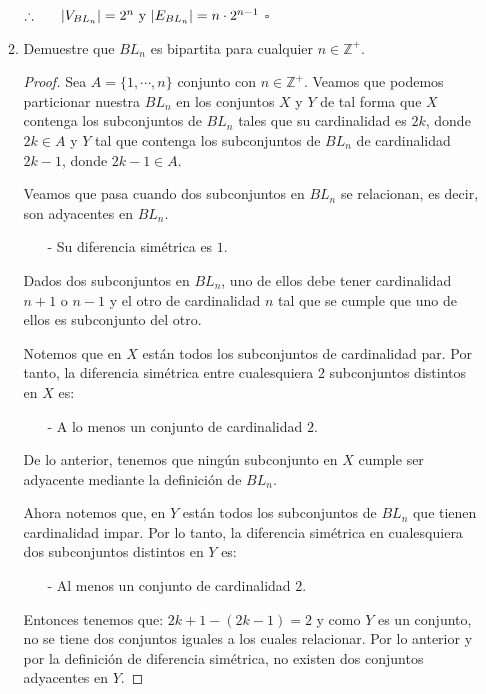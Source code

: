 \documentclass{article}
\begin{document}
\begin{enumerate}
\begin{enumerate}
      \hspace*{4 cm} $\therefore\ \ \ \ \ \abs{V_{BL_n}} = 2^n
      \text{ y } |E_{BL_n}| = n \cdot 2^{n -1}$
      \hfill $\square$
      
    \item Demuestre que $BL_n$ es bipartita para cualquier $n \in \mathbb{Z}^+$. 
      
      \begin{proof}
        
        Sea $A = \{1, \dotsm,n\}$ conjunto con $n \in \mathbb{Z}^+$.     
        Veamos que podemos particionar nuestra $BL_n$ en los conjuntos
        $X$ y $Y$ de tal forma que $X$ contenga los subconjuntos de
        $BL_n$ tales que su cardinalidad es $2k$, donde $2k \in A$  y
        $Y$ tal que contenga los subconjuntos de $BL_n$ de cardinalidad
        $2k -1$, donde $2k -1 \in A$.
        
        Veamos que pasa cuando dos subconjuntos en $BL_n$ se relacionan,
        es decir, son adyacentes en $BL_n$.
        \begin{itemize}
        \item[-] Su diferencia simétrica es $1$.
        \end{itemize}
        Dados dos subconjuntos en $BL_n$, uno de ellos debe tener cardinalidad
        $n+1$ o $n-1$ y el otro de cardinalidad $n$ tal que se cumple que uno
        de ellos es subconjunto del otro.
        
        Notemos que en $X$ están todos los subconjuntos de cardinalidad par.
        Por tanto, la diferencia simétrica entre cualesquiera 2 subconjuntos
        distintos en $X$ es:
        \begin{itemize}
        \item[-] A lo menos un conjunto de cardinalidad $2$.
        \end{itemize}
        De lo anterior, tenemos que ningún subconjunto en
        $X$ cumple ser adyacente mediante la definición de $BL_n$.
        
        Ahora notemos que, en $Y$ están todos los subconjuntos de
        $BL_n$  que tienen cardinalidad impar. Por lo tanto, la
        diferencia simétrica en cualesquiera dos subconjuntos
        distintos en $Y$ es:
        \begin{itemize}
        \item[-] Al menos un conjunto de cardinalidad $2$.
        \end{itemize}
        Entonces tenemos que: $2k + 1 - (2k -1) = 2$ y como $Y$
        es un conjunto, no se tiene dos conjuntos iguales a los
        cuales relacionar. Por lo anterior y por la definición de
        diferencia simétrica, no existen dos conjuntos adyacentes
        en $Y$.
        

\end{proof}
\end{enumerate}
\end{enumerate}
\end{document}
